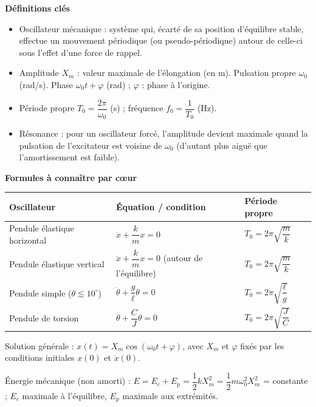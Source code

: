 \documentclass[11pt]{article}
\newcommand{\cle}[1]{{\popxbold\color{popdark}#1}}
\begin{document}
\begin{bilan}
\textbf{D\'efinitions cl\'es}
\begin{itemize}
  \item \cle{Oscillateur m\'ecanique} : syst\`eme qui, \'ecart\'e de sa position d'\'equilibre stable, effectue un mouvement p\'eriodique (ou pseudo-p\'eriodique) autour de celle-ci sous l'effet d'une \cle{force de rappel}.
  \item \cle{Amplitude} $X_m$ : valeur maximale de l'\'elongation (en m). \cle{Pulsation propre} $\omega_0$ (rad/s). \cle{Phase} $\omega_0 t+\varphi$ (rad) ; $\varphi$ : phase \`a l'origine.
  \item \cle{P\'eriode propre} $T_0=\dfrac{2\pi}{\omega_0}$ (s) ; \cle{fr\'equence} $f_0=\dfrac{1}{T_0}$ (Hz).
  \item \cle{R\'esonance} : pour un oscillateur forc\'e, l'amplitude devient maximale quand la pulsation de l'excitateur est voisine de $\omega_0$ (d'autant plus aigu\"e que l'amortissement est faible).
\end{itemize}

\textbf{Formules \`a conna\^itre par c\oe ur}
\begin{center}
\begin{tabularx}{\linewidth}{|l|X|X|}\hline
\rowcolor{popblueL} \textbf{Oscillateur} & \textbf{\'Equation / condition} & \textbf{P\'eriode propre} \\ \hline
Pendule \'elastique horizontal & $\ddot{x}+\dfrac{k}{m}x=0$ & $T_0=2\pi\sqrt{\dfrac{m}{k}}$ \\ \hline
Pendule \'elastique vertical & $\ddot{x}+\dfrac{k}{m}x=0$ (autour de l'\'equilibre) & $T_0=2\pi\sqrt{\dfrac{m}{k}}$ \\ \hline
Pendule simple ($\theta\lesssim 10^{\circ}$) & $\ddot{\theta}+\dfrac{g}{\ell}\theta=0$ & $T_0=2\pi\sqrt{\dfrac{\ell}{g}}$ \\ \hline
Pendule de torsion & $\ddot{\theta}+\dfrac{C}{J}\theta=0$ & $T_0=2\pi\sqrt{\dfrac{J}{C}}$ \\ \hline
\end{tabularx}
\end{center}

Solution g\'en\'erale : $x(t)=X_m\cos(\omega_0 t+\varphi)$, avec $X_m$ et $\varphi$ fix\'es par les \cle{conditions initiales} $x(0)$ et $\dot{x}(0)$.

\'Energie m\'ecanique (non amorti) : $E=E_c+E_p=\dfrac12 kX_m^2=\dfrac12 m\omega_0^2X_m^2$ = constante ; $E_c$ maximale \`a l'\'equilibre, $E_p$ maximale aux extr\'emit\'es.


\end{bilan}
\end{document}
